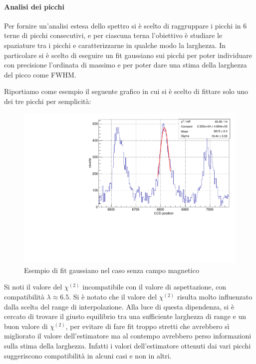 \documentclass{article}
\begin{document}
	\paragraph{Analisi dei picchi}


	Per fornire un'analisi estesa dello spettro si è scelto di raggruppare
	i picchi in 6 terne di picchi consecutivi, e per ciascuna terna
	l'obiettivo è studiare le spaziature tra i picchi e caratterizzarne in
	qualche modo la larghezza. 
	In particolare si è scelto di eseguire un fit gaussiano sui picchi
	per poter individuare con precisione l'ordinata di massimo e per
	poter dare una stima della larghezza del picco come FWHM.
	
	Riportiamo come esempio il seguente grafico in cui si è scelto di fittare solo uno dei  tre picchi per semplicità:
	
	\begin{center}
		\begin{figure}[H]
			\centering
			\includegraphics[scale=0.38, angle=0]{campospento/singolo.pdf}
			\caption{ Esempio di fit gaussiano nel caso senza campo magnetico}
			\label{fig:singoloBoff}
		\end{figure}
	\end{center}
	
	Si noti il valore del $\chi^{(2)}$ incompatibile con il valore di aspettazione, 
	con compatibilità $\lambda \approx 6.5$. Si è notato che il valore del $\chi^{(2)}$
	risulta molto influenzato dalla scelta del range di interpolazione. Alla luce di questa
	dipendenza, si è cercato di trovare il giusto equilibrio tra una sufficiente
	larghezza di range e un buon valore di $\chi^{(2)}$, per evitare di fare fit troppo
	stretti che avrebbero sì migliorato il valore dell'estimatore ma al contempo avrebbero 
	perso informazioni sulla stima della larghezza.
	Infatti i valori dell'estimatore ottenuti dai vari picchi suggeriscono compatibilità 
	in alcuni casi e non in altri.
\end{document}
